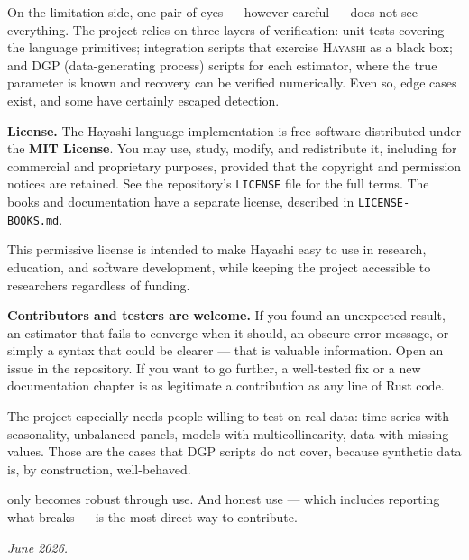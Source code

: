 On the limitation side, one pair of eyes — however careful — does not see
everything. The project relies on three layers of verification: unit tests
covering the language primitives; integration scripts that exercise
\textsc{Hayashi} as a black box; and DGP (data-generating process) scripts
for each estimator, where the true parameter is known and recovery can be
verified numerically. Even so, edge cases exist, and some have certainly
escaped detection.

\bigskip

\noindent\textbf{License.} The Hayashi language implementation is free
software distributed under the \textbf{MIT License}. You may use, study,
modify, and redistribute it, including for commercial and proprietary
purposes, provided that the copyright and permission notices are retained.
See the repository's \texttt{LICENSE} file for the full terms. The books and
documentation have a separate license, described in \texttt{LICENSE-BOOKS.md}.

This permissive license is intended to make Hayashi easy to use in research,
education, and software development, while keeping the project accessible to
researchers regardless of funding.

\bigskip

\noindent\textbf{Contributors and testers are welcome.} If you found an
unexpected result, an estimator that fails to converge when it should, an
obscure error message, or simply a syntax that could be clearer — that is
valuable information. Open an issue in the repository. If you want to go
further, a well-tested fix or a new documentation chapter is as legitimate
a contribution as any line of Rust code.

The project especially needs people willing to test \hayashi{} on real
data: time series with seasonality, unbalanced panels, models with
multicollinearity, data with missing values. Those are the cases that DGP
scripts do not cover, because synthetic data is, by construction,
well-behaved.

\hayashi{} only becomes robust through use. And honest use — which includes
reporting what breaks — is the most direct way to contribute.

\bigskip

\noindent\textit{June 2026.}
